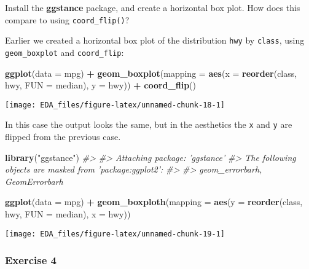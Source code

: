 \documentclass[]{book}
\newenvironment{Shaded}{\begin{snugshade}}{\end{snugshade}}
\newcommand{\CommentTok}[1]{\textcolor[rgb]{0.56,0.35,0.01}{\textit{#1}}}
\newcommand{\DataTypeTok}[1]{\textcolor[rgb]{0.13,0.29,0.53}{#1}}
\newcommand{\KeywordTok}[1]{\textcolor[rgb]{0.13,0.29,0.53}{\textbf{#1}}}
\newcommand{\NormalTok}[1]{#1}
\newcommand{\OperatorTok}[1]{\textcolor[rgb]{0.81,0.36,0.00}{\textbf{#1}}}
\newcommand{\StringTok}[1]{\textcolor[rgb]{0.31,0.60,0.02}{#1}}
\theoremstyle{definition}
\theoremstyle{definition}
\theoremstyle{definition}
\theoremstyle{remark}
\begin{document}
Install the \textbf{ggstance} package, and create a horizontal box plot.
How does this compare to using \texttt{coord\_flip()}?

Earlier we created a horizontal box plot of the distribution
\texttt{hwy} by \texttt{class}, using \texttt{geom\_boxplot} and
\texttt{coord\_flip}:

\begin{Shaded}
\begin{Highlighting}[]
\KeywordTok{ggplot}\NormalTok{(}\DataTypeTok{data =}\NormalTok{ mpg) }\OperatorTok{+}
\StringTok{  }\KeywordTok{geom_boxplot}\NormalTok{(}\DataTypeTok{mapping =} \KeywordTok{aes}\NormalTok{(}\DataTypeTok{x =} \KeywordTok{reorder}\NormalTok{(class, hwy, }\DataTypeTok{FUN =}\NormalTok{ median), }\DataTypeTok{y =}\NormalTok{ hwy)) }\OperatorTok{+}
\StringTok{  }\KeywordTok{coord_flip}\NormalTok{()}
\end{Highlighting}
\end{Shaded}

\begin{center}\texttt{[image: EDA\_files/figure-latex/unnamed-chunk-18-1]} \end{center}

In this case the output looks the same, but in the aesthetics the
\texttt{x} and \texttt{y} are flipped from the previous case.

\begin{Shaded}
\begin{Highlighting}[]
\KeywordTok{library}\NormalTok{(}\StringTok{"ggstance"}\NormalTok{)}
\CommentTok{#> }
\CommentTok{#> Attaching package: 'ggstance'}
\CommentTok{#> The following objects are masked from 'package:ggplot2':}
\CommentTok{#> }
\CommentTok{#>     geom_errorbarh, GeomErrorbarh}

\KeywordTok{ggplot}\NormalTok{(}\DataTypeTok{data =}\NormalTok{ mpg) }\OperatorTok{+}
\StringTok{  }\KeywordTok{geom_boxploth}\NormalTok{(}\DataTypeTok{mapping =} \KeywordTok{aes}\NormalTok{(}\DataTypeTok{y =} \KeywordTok{reorder}\NormalTok{(class, hwy, }\DataTypeTok{FUN =}\NormalTok{ median), }\DataTypeTok{x =}\NormalTok{ hwy))}
\end{Highlighting}
\end{Shaded}

\begin{center}\texttt{[image: EDA\_files/figure-latex/unnamed-chunk-19-1]} \end{center}

\hypertarget{exercise-4-7}{%
\subsubsection{Exercise 4}\label{exercise-4-7}}
\end{document}
